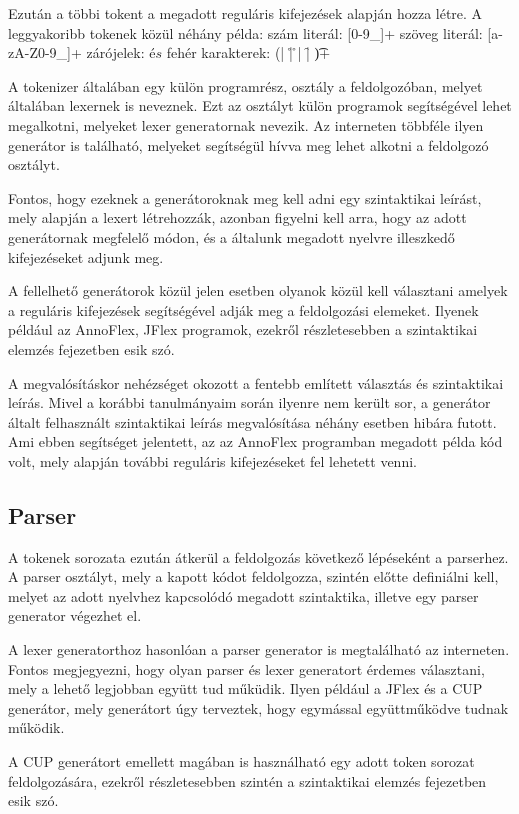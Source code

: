 Ezután a többi tokent a megadott reguláris kifejezések alapján hozza létre. A leggyakoribb tokenek közül néhány példa:
szám literál: [0-9_]+
szöveg literál: [a-zA-Z0-9_]+
zárójelek: \( és \)
fehér karakterek: (\n | \r | \r\n | \f | \t)+

A tokenizer általában egy külön programrész, osztály a feldolgozóban, melyet általában lexernek is neveznek. Ezt az osztályt külön programok segítségével lehet megalkotni, melyeket lexer generatornak nevezik. Az interneten többféle ilyen generátor is található, melyeket segítségül hívva meg lehet alkotni a feldolgozó osztályt.

Fontos, hogy ezeknek a generátoroknak meg kell adni egy szintaktikai leírást, mely alapján a lexert létrehozzák, azonban figyelni kell arra, hogy az adott generátornak megfelelő módon, és a általunk megadott nyelvre illeszkedő kifejezéseket adjunk meg.

A fellelhető generátorok közül jelen esetben olyanok közül kell választani amelyek a reguláris kifejezések segítségével adják meg a feldolgozási elemeket. Ilyenek  például az AnnoFlex, JFlex programok, ezekről részletesebben a szintaktikai elemzés fejezetben esik szó.

A megvalósításkor nehézséget okozott a fentebb említett választás és szintaktikai leírás. Mivel a korábbi tanulmányaim során ilyenre nem került sor, a generátor általt felhasznált szintaktikai leírás megvalósítása néhány esetben hibára futott. Ami ebben segítséget jelentett, az az AnnoFlex programban megadott példa kód volt, mely alapján további reguláris kifejezéseket fel lehetett venni.

\subsection{Parser}

A tokenek sorozata ezután átkerül a feldolgozás következő lépéseként a parserhez. A parser osztályt, mely a kapott kódot feldolgozza, szintén előtte definiálni kell, melyet az adott nyelvhez kapcsolódó megadott szintaktika, illetve egy parser generator végezhet el.

A lexer generatorthoz hasonlóan a parser generator is megtalálható az interneten. Fontos megjegyezni, hogy olyan parser és lexer generatort érdemes választani, mely a lehető legjobban együtt tud műküdik. Ilyen például a JFlex és a CUP generátor, mely generátort úgy terveztek, hogy egymással együttműködve tudnak működik.

A CUP generátort emellett magában is használható egy adott token sorozat feldolgozására, ezekről részletesebben szintén a szintaktikai elemzés fejezetben esik szó.

